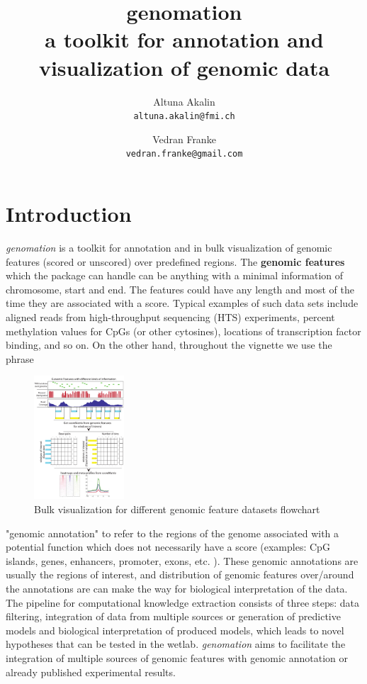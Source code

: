 \documentclass{article}\usepackage[]{graphicx}\usepackage[]{color}
\title{\textbf{genomation} \\ a toolkit for annotation and visualization of genomic data}
\author{Altuna Akalin \\ \texttt{altuna.akalin@fmi.ch}
\and Vedran Franke \\ \texttt{vedran.franke@gmail.com} }
\newcommand{\Rpackage}[1]{{\textit{#1}}}
\begin{document}
\maketitle
\tableofcontents
\vspace{300pt}

\section{Introduction}
 


\Rpackage{genomation} is a toolkit for annotation and in bulk visualization of
genomic features (scored or unscored) over predefined regions. 
The \textbf{genomic features} which the package can handle can 
be anything with a minimal information of chromosome, start and end. 
The features could have any length and most of the time they are 
associated with a score. Typical examples of such data sets include aligned  
reads from high-throughput sequencing (HTS) experiments, percent methylation 
values for CpGs (or other cytosines), locations of transcription factor binding, 
and so on. On the other hand, throughout the vignette we use the phrase 

\begin{figure}
  \begin{center}
    \includegraphics[width=0.3\textwidth]{Figures/genomationFlowChart1.pdf}
    \caption{Bulk visualization for different genomic feature datasets flowchart}
  \end{center}
  \vspace{-40pt}
\end{figure}

"genomic annotation" to refer to the regions of the genome associated with a 
potential function which does not necessarily have a score 
(examples: CpG islands, genes, enhancers, promoter, exons, etc. ). 
These genomic annotations are usually the regions of interest, and distribution 
of genomic features over/around the annotations are can make the way for 
biological interpretation of the data.
The pipeline for computational knowledge extraction consists of three steps: 
data filtering, integration of data from multiple sources or generation of 
predictive models and biological interpretation of produced models, which leads 
to novel hypotheses that can be tested in the wetlab. \Rpackage{genomation} aims
to facilitate the integration of multiple sources of genomic features with 
genomic annotation or already published experimental results.
\end{document}
